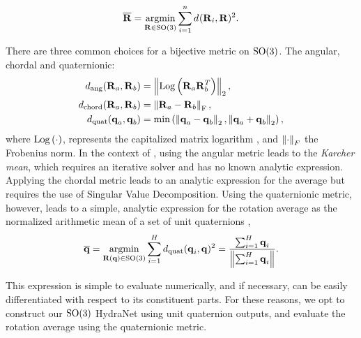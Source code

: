 \begin{equation}
\label{eq:rot_mean}
\boldsymbol{\mathbf{\overline{R}}} = \operatorname*{argmin}_{\boldsymbol{\mathbf{R}} \in \mathrm{SO}(3)} \sum_{i=1}^n d_\mathrm{}(\boldsymbol{\mathbf{R}}_i, \boldsymbol{\mathbf{R}})^2.
\end{equation}





There are three common choices for a bijective metric \citep{Hartley2013-rc,Carlone2015-ud} on $\mathrm{SO}(3)$. The angular, chordal and quaternionic:
\begin{align}
d_\mathrm{ang}(\boldsymbol{\mathbf{R}}_a, \boldsymbol{\mathbf{R}}_b) &= \left\Vert\mathrm{Log}\left({\boldsymbol{\mathbf{R}}_a \boldsymbol{\mathbf{R}}_b^T}\right)\right\Vert_2, \\
 d_\mathrm{chord}(\boldsymbol{\mathbf{R}}_a, \boldsymbol{\mathbf{R}}_b) &= \left\Vert\boldsymbol{\mathbf{R}}_a - \boldsymbol{\mathbf{R}}_b\right\Vert_\mathrm{F}, \\
 d_\mathrm{quat}(\boldsymbol{\mathbf{q}}_a, \boldsymbol{\mathbf{q}}_b) &= \min\left( \left\Vert\boldsymbol{\mathbf{q}}_a - \boldsymbol{\mathbf{q}}_b\right\Vert_2, \left\Vert\boldsymbol{\mathbf{q}}_a + \boldsymbol{\mathbf{q}}_b\right\Vert_2 \right),
\end{align}
where $\mathrm{Log}\left({\cdot}\right)$, represents the capitalized matrix logarithm \citep{Sola2018-kg}, and $\left\Vert\cdot\right\Vert_F$ the Frobenius norm. In the context of , using the angular metric leads to the \textit{Karcher mean}, which requires an iterative solver and has no known analytic expression. Applying the chordal metric leads to an analytic expression for the average but requires the use of Singular Value Decomposition. Using the quaternionic metric, however, leads to a simple, analytic expression for the rotation average as the normalized arithmetic mean of a set of unit quaternions \citep{Hartley2013-rc},
\begin{equation}
\label{eq:quat_mean}
\overline{\boldsymbol{\mathbf{q}}} = \operatorname*{argmin}_{\boldsymbol{\mathbf{R}}(\boldsymbol{\mathbf{q}}) \in \mathrm{SO}(3)} \sum_{i=1}^H d_\mathrm{quat}(\boldsymbol{\mathbf{q}}_i, \boldsymbol{\mathbf{q}})^2 = \frac{\sum_{i=1}^H \boldsymbol{\mathbf{q}}_i}{\left\Vert\sum_{i=1}^H \boldsymbol{\mathbf{q}}_i\right\Vert}.
\end{equation}

This expression is simple to evaluate numerically, and if necessary, can be easily differentiated with respect to its constituent parts. For these reasons, we opt to construct our $\mathrm{SO}(3)$ HydraNet using unit quaternion outputs, and evaluate the rotation average using the quaternionic metric.



